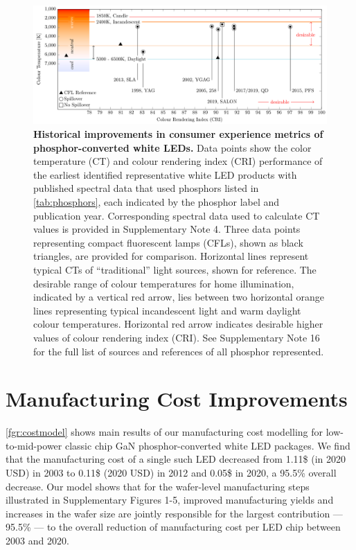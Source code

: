 \documentclass[parskip=full]{article}
\begin{document}
\begin{figure}[H]
 \centering
 \includegraphics[width=\textwidth]{figures/breakthroughs_consumer-experience.pdf}
 \caption{\textbf{Historical improvements in consumer experience metrics of phosphor-converted white LEDs.} Data points show the color temperature (CT) and colour rendering index (CRI) performance of the earliest identified representative white LED products with published spectral data that used phosphors listed in \cref{tab:phosphors}, each indicated by the phosphor label and publication year. Corresponding spectral data used to calculate CT values is provided in Supplementary Note 4. Three data points representing compact fluorescent lamps (CFLs)\cite{cie_reference}, shown as black triangles, are provided for comparison. Horizontal lines represent typical CTs of “traditional” light sources, shown for reference. The desirable range of colour temperatures for home illumination, indicated by a vertical red arrow, lies between two horizontal orange lines representing typical incandescent light and warm daylight colour temperatures. Horizontal red arrow indicates desirable higher values of colour rendering index (CRI). See Supplementary Note 16 for the full list of sources and references of all phosphor represented.}
 \label{fgr:consumer_experience}
\end{figure}

\section{Manufacturing Cost Improvements}

\cref{fgr:costmodel} shows main results of our manufacturing cost modelling for low-to-mid-power classic chip GaN phosphor-converted white LED packages. We find that the manufacturing cost of a single such LED decreased from 1.11\$ (in 2020 USD) in 2003 to 0.11\$ (2020 USD) in 2012 and 0.05\$ in 2020, a 95.5\% overall decrease. Our model shows that for the wafer-level manufacturing steps illustrated in Supplementary Figures 1-5, improved manufacturing yields and increases in the wafer size are jointly responsible for the largest contribution — 95.5\% — to the overall reduction of manufacturing cost per LED chip between 2003 and 2020.
\end{document}
